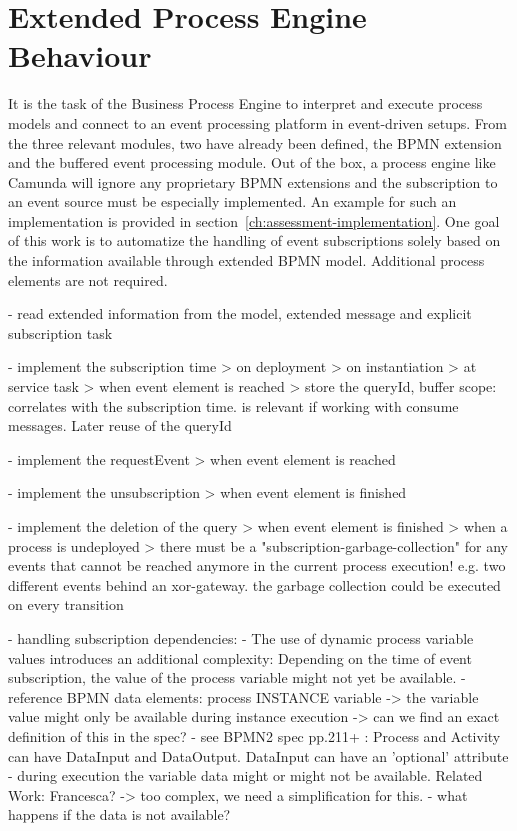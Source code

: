\section{Extended Process Engine Behaviour}\label{ch:extendedprocessengine}
It is the task of the Business Process Engine to interpret and execute process models and connect to an event processing platform in event-driven setups.
From the three relevant modules, two have already been defined, the BPMN extension and the buffered event processing module.
Out of the box, a process engine like Camunda will ignore any proprietary BPMN extensions and the subscription to an event source must be especially implemented. An example for such an implementation is provided in section~\autoref{ch:assessment-implementation}.
One goal of this work is to automatize the handling of event subscriptions solely based on the information available through extended BPMN model. Additional process elements are not required.

- read extended information from the model, extended message and explicit subscription task

- implement the subscription time
> on deployment
> on instantiation
> at service task
> when event element is reached
> store the queryId, buffer scope: correlates with the subscription time. is relevant if working with consume messages. Later reuse of the queryId

- implement the requestEvent
> when event element is reached

- implement the unsubscription
> when event element is finished

- implement the deletion of the query
> when event element is finished
> when a process is undeployed
> there must be a "subscription-garbage-collection" for any events that cannot be reached anymore in the current process execution! e.g. two different events behind an xor-gateway. the garbage collection could be executed on every transition


- handling subscription dependencies:
- The use of dynamic process variable values introduces an additional complexity: Depending on the time of event subscription, the value of the process variable might not yet be available.
- reference BPMN data elements: process INSTANCE variable
-> the variable value might only be available during instance execution
-> can we find an exact definition of this in the spec?
- see BPMN2 spec pp.211+ : Process and Activity can have DataInput and DataOutput. DataInput can have an 'optional' attribute
- during execution the variable data might or might not be available. Related Work: Francesca?
-> too complex, we need a simplification for this.
- what happens if the data is not available?

